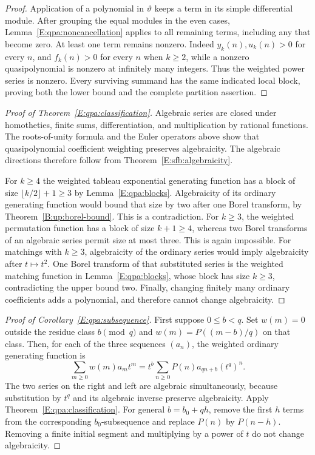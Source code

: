 \documentclass[11pt,a4paper]{article}
\theoremstyle{definition}
\theoremstyle{remark}
\numberwithin{equation}{section}
\begin{document}
\begin{proof}
Application of a polynomial in $\vartheta$ keeps a term in its
simple differential module.  After grouping the equal modules
in the even cases, Lemma~\ref{E:qpa:noncancellation} applies to all
remaining terms, including any that become zero.  At least one
term remains nonzero.  Indeed $y_k(n),u_k(n)>0$ for every $n$,
and $f_k(n)>0$ for every $n$ when $k\ge2$, while a nonzero
quasipolynomial is nonzero at infinitely many integers.
Thus the weighted power series is nonzero.  Every surviving
summand has the same indicated local block, proving both the
lower bound and the complete partition assertion.
\end{proof}

\begin{proof}[Proof of Theorem~\ref{E:qpa:classification}]
Algebraic series are closed under homotheties, finite sums,
differentiation, and multiplication by rational functions.
The roots-of-unity formula and the Euler operators above show
that quasipolynomial coefficient weighting preserves algebraicity.
The algebraic directions therefore follow from
Theorem~\ref{E:sfb:algebraicity}.

For $k\ge4$ the weighted tableau exponential generating
function has a block of size $\lfloor k/2\rfloor+1\ge3$ by
Lemma~\ref{E:qpa:blocks}.  Algebraicity of its ordinary generating
function would bound that size by two after one Borel transform,
by Theorem~\ref{B:up:borel-bound}.  This is a contradiction.
For $k\ge3$, the weighted permutation function has a block of
size $k+1\ge4$, whereas two Borel transforms of an algebraic
series permit size at most three.  This is again impossible.
For matchings with $k\ge3$, algebraicity of the ordinary series
would imply algebraicity after $t\mapsto t^2$.  One Borel
transform of that substituted series is the weighted matching
function in Lemma~\ref{E:qpa:blocks}, whose block has size
$k\ge3$, contradicting the upper bound two.
Finally, changing finitely many ordinary coefficients adds a
polynomial, and therefore cannot change algebraicity.
\end{proof}

\begin{proof}[Proof of Corollary~\ref{E:qpa:subsequence}]
First suppose $0\le b<q$.  Set $w(m)=0$ outside the residue
class $b\pmod q$ and $w(m)=P((m-b)/q)$ on that class.
Then, for each of the three sequences $(a_n)$, the weighted
ordinary generating function is
\[
 \sum_{m\ge0}w(m)a_mt^m
      =t^b\sum_{n\ge0}P(n)a_{qn+b}(t^q)^n.
\]
The two series on the right and left are algebraic simultaneously,
because substitution by $t^q$ and its algebraic inverse preserve
algebraicity.  Apply Theorem~\ref{E:qpa:classification}.
For general $b=b_0+qh$, remove the first $h$ terms from the
corresponding $b_0$-subsequence and replace $P(n)$ by $P(n-h)$.
Removing a finite initial segment and multiplying by a power
of $t$ do not change algebraicity.
\end{proof}
\end{document}
